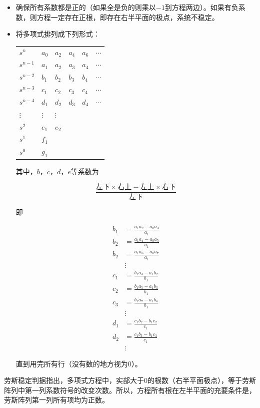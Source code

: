 \begin{itemize}
	\item	确保所有系数都是正的（如果全是负的则乘以$-1$到方程两边）。如果有负系数，则方程一定存在正根，即存在右半平面的极点，系统不稳定。
	\item	将多项式排列成下列形式：

	\begin{tabular}{llllll}
	$s^n$	&$a_0$	&$a_2$	&$a_4$	&$a_6$	& $\cdots$	\\
	$s^{n-1}$	&$a_1$	&$a_2$	&$a_3$	&$a_4$	& $\cdots$	\\
	$s^{n-2}$	&$b_1$	&$b_2$	&$b_3$	&$b_4$	& $\cdots$	\\
	$s^{n-3}$	&$c_1$	&$c_2$	&$c_3$	&$c_4$	& $\cdots$	\\
	$s^{n-4}$	&$d_1$	&$d_2$	&$d_3$	&$d_4$	& $\cdots$	\\
	$\vdots$	&$\vdots$	&$\vdots$\\
	$s^{2}$	&$e_1$	&$e_2$\\
	$s^{1}$	&$f_1$\\
	$s^{0}$	&$g_1$
	\end{tabular}

	其中，$b$，$c$，$d$，$e$等系数为

	\begin{equation*}
	\frac{\mbox{左下}\times\mbox{右上}-\mbox{左上}\times\mbox{右下}}{\mbox{左下}}
	\end{equation*}
	
	即

	\begin{align*}
	b_1&=\frac{a_1a_2-a_0a_3}{a_1}\\
	b_2&=\frac{a_1a_4-a_0a_5}{a_1}\\
	b_2&=\frac{a_1a_6-a_0a_7}{a_1}\\
	&\vdots\\
	c_1&=\frac{b_1a_3-a_1b_2}{b_1}\\
	c_2&=\frac{b_1a_5-a_1b_3}{b_1}\\
	c_3&=\frac{b_1a_7-a_1b_4}{b_1}\\
	&\vdots\\
	d_1&=\frac{c_1b_2-b_1c_2}{c_1}\\
	d_2&=\frac{c_1b_3-b_1c_3}{c_1}\\
	&\vdots
	\end{align*}
	
	直到用完所有行（没有数的地方视为$0$）。
\end{itemize}

劳斯稳定判据指出，多项式方程中，实部大于$0$的根数（右半平面极点），等于劳斯阵列中第一列系数符号的改变次数。所以，方程所有根在左半平面的充要条件是，劳斯阵列第一列所有项均为正数。

